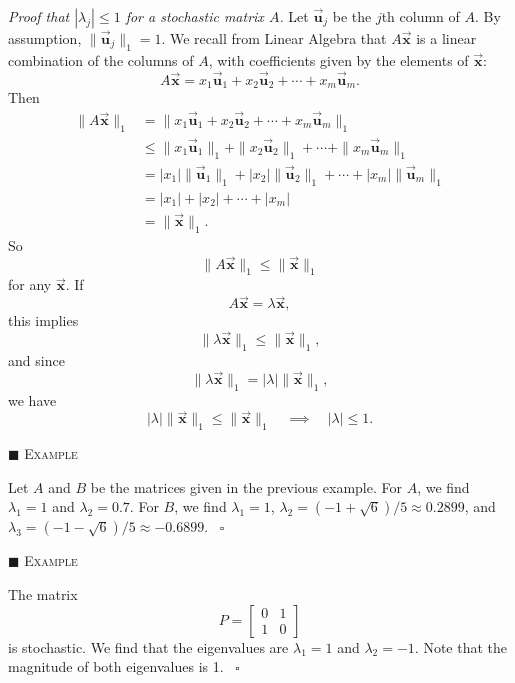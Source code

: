 \documentclass[reqno]{immbook}
\newcommand{\BU}{\vec{\textbf{u}}}
\newcommand{\BX}{\vec{\textbf{x}}}
\numberwithin{equation}{chapter}
\numberwithin{question}{section}
\numberwithin{theorem}{chapter}
\numberwithin{figure}{chapter}
\theoremstyle{definition}
\newenvironment{xexample}%
{%

\medskip\noindent\addtocounter{example}{1}$\blacksquare$ \textsc{Example \theexample}\hspace*{1em}%
}%
{%
~\hfill$\square$

\medskip
}
\begin{document}
\emph{Proof that $|\lambda_j|\le 1$ for a stochastic matrix $A$.}
Let $\BU_j$ be the $j$th column of $A$.
By assumption, $\|\BU_j\|_1 = 1$.
We recall from Linear Algebra that
$A\BX$ is a linear combination of the columns of $A$, with
coefficients given by the elements of $\BX$:
\begin{equation}
  A\BX = x_1 \BU_1 + x_2\BU_2 + \cdots + x_m \BU_m.
\end{equation}
Then
\begin{equation}
\begin{split}
  \|A\BX\|_1 & = \|x_1\BU_1 + x_2 \BU_2 + \cdots + x_m\BU_m\|_1 \\
             & \le \|x_1 \BU_1\|_1 + \|x_2 \BU_2\|_1 + \cdots + \| x_m \BU_m\|_1 \\
	     & = |x_1|\|\BU_1\|_1 + |x_2|\|\BU_2\|_1 + \cdots + |x_m|\|\BU_m\|_1 \\
	     & = |x_1| + |x_2| + \cdots + |x_m| \\
	     & = \|\BX\|_1.
\end{split}
\end{equation}
So
\begin{equation}
\|A\BX\|_1 \le \|\BX\|_1
\end{equation}
for any $\BX$.  If
\begin{equation}
  A\BX = \lambda \BX,
\end{equation}
this implies
\begin{equation}
  \|\lambda\BX\|_1 \le \|\BX\|_1,
\end{equation}
and since
\begin{equation}
  \|\lambda \BX\|_1 = |\lambda|\|\BX\|_1,
\end{equation}
we have
\begin{equation}
 |\lambda| \|\BX\|_1 \le \|\BX\|_1
 \quad
 \implies
 \quad
 |\lambda| \le 1.
\end{equation}
\begin{xexample}
Let $A$ and $B$ be the matrices given in the previous example.
For $A$, we find $\lambda_1 = 1$ and $\lambda_2 = 0.7$.
For $B$, we find $\lambda_1 = 1$,
$\lambda_2 = (-1+\sqrt{6})/5 \approx 0.2899$,
and $\lambda_3 = (-1-\sqrt{6})/5 \approx -0.6899$.
\end{xexample}
\begin{xexample}
The matrix
\begin{equation}
  P = \begin{bmatrix}
          0 & 1 \\
	  1 & 0
      \end{bmatrix}
\end{equation}
is stochastic. We find that the eigenvalues
are $\lambda_1 = 1$ and $\lambda_2 = -1$.
Note that the magnitude of both eigenvalues is 1.
\end{xexample}
\newpage
%
\end{document}
